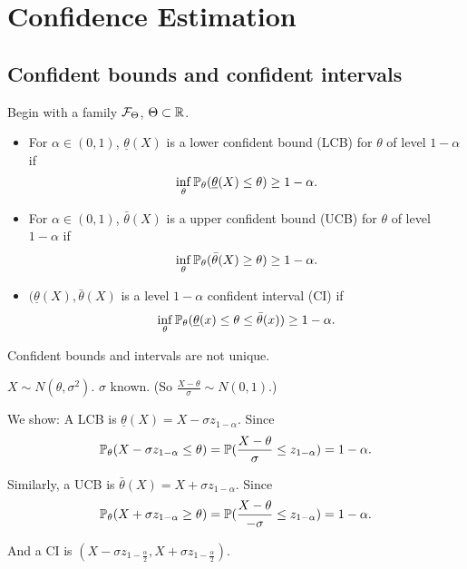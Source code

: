 \section{Confidence Estimation}
\subsection{Confident bounds and confident intervals}
\begin{mydef}Begin with a family $\mathcal{F}_\Theta$, $\Theta\subset \mathbb{R}$. 
	\begin{itemize}
		\item For $\alpha \in (0,1)$, $\underline{\theta}(X)$ is a lower confident bound (LCB) for $\theta$ of level $1-\alpha$ if 
		$$\inf_\theta \mathbb{P}_\theta (\underline{\theta}(X) \leq \theta) \geq 1-\alpha .$$
		
		\item For $\alpha \in (0,1)$, $\bar{\theta}(X)$ is a upper confident bound (UCB) for $\theta$ of level $1-\alpha$ if 
		$$\inf_\theta \mathbb{P}_\theta (\bar{\theta}(X) \geq \theta) \geq 1-\alpha .$$
		
		\item $(\underline{\theta}(X),\bar{\theta}(X)$ is a level $1-\alpha$ confident interval (CI) if 
		$$\inf_\theta \mathbb{P}_\theta (\underline{\theta}(x) \leq \theta \leq \bar{\theta}(x))  \geq 1-\alpha.$$
	\end{itemize}
\end{mydef}
\begin{remark}
	Confident bounds and intervals are not unique.
\end{remark}

\begin{exap}
	$X \sim N(\theta, \sigma^2)$. $\sigma$ known. (So $\frac{X-\theta}{\sigma} \sim N(0,1)$.)
	
	We show: A LCB is $\underline{\theta}(X) = X - \sigma z_{1-\alpha}$. Since
	$$\mathbb{P}_\theta( X-\sigma z_{1-\alpha} \leq \theta ) = \mathbb{P}( \frac{X-\theta}{\sigma} \leq z_{1-\alpha} ) = 1- \alpha.$$
	
	Similarly, a UCB is $\bar{\theta}(X) = X + \sigma z_{1-\alpha}$. Since
	$$\mathbb{P}_\theta( X+\sigma z_{1-\alpha} \geq \theta ) = \mathbb{P}( \frac{X-\theta}{-\sigma} \leq z_{1-\alpha} ) = 1- \alpha.$$
	
	And a CI is $(X-\sigma z_{1-\frac{\alpha}{2}}, X+\sigma z_{1-\frac{\alpha}{2}})$.
\end{exap}

